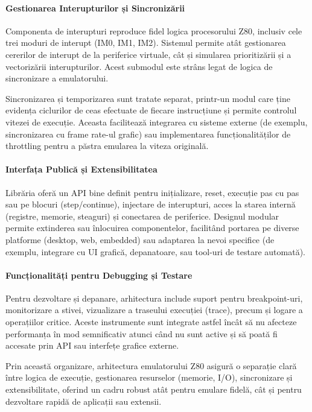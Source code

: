 \documentclass[titlepage,12pt]{article}
\begin{document}
\paragraph{Gestionarea Interupturilor și Sincronizării}

Componenta de interupturi reproduce fidel logica procesorului Z80, inclusiv cele trei moduri de interupt (IM0, IM1, IM2). Sistemul permite atât gestionarea cererilor de interupt de la periferice virtuale, cât și simularea prioritizării și a vectorizării interupturilor. Acest submodul este strâns legat de logica de sincronizare a emulatorului.

Sincronizarea și temporizarea sunt tratate separat, printr-un modul care ține evidența ciclurilor de ceas efectuate de fiecare instrucțiune și permite controlul vitezei de execuție. Aceasta facilitează integrarea cu sisteme externe (de exemplu, sincronizarea cu frame rate-ul grafic) sau implementarea funcționalităților de throttling pentru a păstra emularea la viteza originală.

\paragraph{Interfața Publică și Extensibilitatea}

Librăria oferă un API bine definit pentru inițializare, reset, execuție pas cu pas sau pe blocuri (step/continue), injectare de interupturi, acces la starea internă (registre, memorie, steaguri) și conectarea de periferice. Designul modular permite extinderea sau înlocuirea componentelor, facilitând portarea pe diverse platforme (desktop, web, embedded) sau adaptarea la nevoi specifice (de exemplu, integrare cu UI grafică, depanatoare, sau tool-uri de testare automată).

\paragraph{Funcționalități pentru Debugging și Testare}

Pentru dezvoltare și depanare, arhitectura include suport pentru breakpoint-uri, monitorizare a stivei, vizualizare a traseului execuției (trace), precum și logare a operațiilor critice. Aceste instrumente sunt integrate astfel încât să nu afecteze performanța în mod semnificativ atunci când nu sunt active și să poată fi accesate prin API sau interfețe grafice externe.

\bigskip

Prin această organizare, arhitectura emulatorului Z80 asigură o separație clară între logica de execuție, gestionarea resurselor (memorie, I/O), sincronizare și extensibilitate, oferind un cadru robust atât pentru emulare fidelă, cât și pentru dezvoltare rapidă de aplicații sau extensii.
\end{document}
